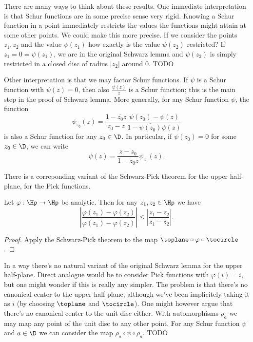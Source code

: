 There are many ways to think about these results. One immediate interpretation is that Schur functions are in some precise sense very rigid. Knowing a Schur function in a point immediately restricts the values the functions might attain at some other points. We could make this more precise. If we consider the points $z_{1}, z_{2}$ and the value $\psi(z_{1})$ how exactly is the value $\psi(z_{2})$ restricted? If $z_{1} = 0 = \psi(z_{1})$, we are in the original Schwarz lemma and $\psi(z_{2})$ is simply restricted in a closed disc of radius $|z_{2}|$ around $0$. TODO

Other interpretation is that we may factor Schur functions. If $\psi$ is a Schur function with $\psi(z) = 0$, then also $\frac{\psi(z)}{z}$ is a Schur function; this is the main step in the proof of Schwarz lemma. More generally, for any Schur function $\psi$, the function
\[
	\psi_{z_{0}}(z) = \frac{1 - \overline{z_{0}}z}{z_{0} - z} \frac{\psi(z_{0}) - \psi(z)}{1 - \overline{\psi(z_{0})} \psi(z)}
\]
is also a Schur function for any $z_{0} \in \D$. In particular, if $\psi(z_{0}) = 0$ for some $z_{0} \in \D$, we can write
\[
	\psi(z) = \frac{z - z_{0}}{1 - \overline{z_{0}} z} \psi_{z_{0}}(z).
\]

There is a correponding variant of the Schwarz-Pick theorem for the upper half-plane, for the Pick functions.

\begin{lause}
	Let $\varphi : \Hp \to \Hp$ be analytic. Then for any $z_{1}, z_{2} \in \Hp$ we have
	\[
		\left|\frac{\varphi(z_{1}) - \varphi(z_{2})}{\varphi(z_{1}) - \overline{\varphi(z_{2})}} \right| \leq \left|\frac{z_{1} - z_{2}}{z_{1} - \overline{z_{2}}} \right|.
	\]
\end{lause}

\begin{proof}
	Apply the Schwarz-Pick theorem to the map $\toplane \circ \varphi \circ \tocircle$.
\end{proof}

In a way there's no natural variant of the original Schwarz lemma for the upper half-plane. Direct analogue would be to consider Pick functions with $\varphi(i) = i$, but one might wonder if this is really any simpler. The problem is that there's no canonical center to the upper half-plane, although we've been implicitely taking it as $i$ (by choosing $\toplane$ and $\tocircle$). One might however argue that there's no canonical center to the unit disc either. With automorphisms $\rho_{a}$ we may map any point of the unit disc to any other point. For any Schur function $\psi$ and $a \in \D$ we can consider the map $\rho_{a} \circ \psi \circ \rho_{a}$. TODO

